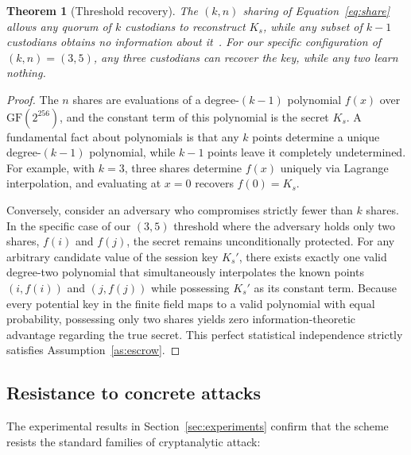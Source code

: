 \documentclass[pdflatex,sn-mathphys-num]{sn-jnl}%
\theoremstyle{thmstyleone}%
\newtheorem{theorem}{Theorem}%
\theoremstyle{thmstyletwo}%
\theoremstyle{thmstylethree}%
\begin{document}
\begin{theorem}[Threshold recovery]
\label{thm:share}
The $(k,n)$ sharing of Equation~\eqref{eq:share} allows any quorum of $k$ custodians to reconstruct $K_s$, while any subset of $k-1$ custodians obtains no information about it~\cite{shamir1979}. For our specific configuration of $(k,n)=(3,5)$, any three custodians can recover the key, while any two learn nothing.
\end{theorem}

\begin{proof}
The $n$ shares are evaluations of a degree-$(k-1)$ polynomial $f(x)$ over $\mathrm{GF}(2^{256})$, and the constant term of this polynomial is the secret $K_s$. A fundamental fact about polynomials is that any $k$ points determine a unique degree-$(k-1)$ polynomial, while $k-1$ points leave it completely undetermined. For example, with $k=3$, three shares determine $f(x)$ uniquely via Lagrange interpolation, and evaluating at $x=0$ recovers $f(0)=K_s$.

Conversely, consider an adversary who compromises strictly fewer than $k$ shares. In the specific case of our $(3,5)$ threshold where the adversary holds only two shares, $f(i)$ and $f(j)$, the secret remains unconditionally protected. For any arbitrary candidate value of the session key $K_s'$, there exists exactly one valid degree-two polynomial that simultaneously interpolates the known points $(i, f(i))$ and $(j, f(j))$ while possessing $K_s'$ as its constant term. Because every potential key in the finite field maps to a valid polynomial with equal probability, possessing only two shares yields zero information-theoretic advantage regarding the true secret. This perfect statistical independence strictly satisfies Assumption~\ref{as:escrow}.
\end{proof}

\subsection{Resistance to concrete attacks}

The experimental results in Section~\ref{sec:experiments} confirm that the scheme resists the standard families of cryptanalytic attack:
\end{document}
